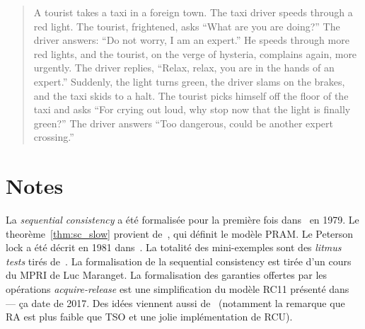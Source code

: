 




\begin{quote}
  A tourist takes a taxi in a foreign town. The taxi driver speeds through a red
  light. The tourist, frightened, asks ``What are you are doing?'' The driver
  answers: ``Do not worry, I am an expert.'' He speeds through more red lights,
  and the tourist, on the verge of hysteria, complains again, more urgently. The
  driver replies, ``Relax, relax, you are in the hands of an expert.'' Suddenly,
  the light turns green, the driver slams on the brakes, and the taxi skids to a
  halt. The tourist picks himself off the floor of the taxi and asks ``For
  crying out loud, why stop now that the light is finally green?'' The driver
  answers ``Too dangerous, could be another expert crossing.''
\end{quote}

\section*{Notes}

La \emph{sequential consistency} a été formalisée pour la première fois
dans~\cite{Lamport79} en 1979. Le theorème~\ref{thm:sc_slow} provient
de~\cite{Lipton1988PramAS}, qui définit le modèle PRAM. Le Peterson lock a été
décrit en 1981 dans~\cite{Peterson81}. La totalité des mini-exemples sont des
\emph{litmus tests} tirés de~\cite{Maranget12}. La formalisation de la
sequential consistency est tirée d'un cours du MPRI de Luc Maranget. La
formalisation des garanties offertes par les opérations \emph{acquire-release}
est une simplification du modèle RC11 présenté dans~\cite{LahavVKHD17} --- ça
date de 2017. Des idées viennent aussi de~\cite{LahavGV16} (notamment la
remarque que RA est plus faible que TSO et une jolie implémentation de RCU).

